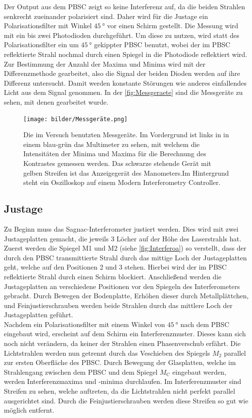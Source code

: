 \noindent Der Output aus dem PBSC zeigt so keine Interferenz auf, da die beiden Strahlen senkrecht zueinander polarisiert sind. Daher wird für die Justage ein Polarisationsfilter mit 
Winkel $\SI{45}{\degree}$ vor einen Schirm gestellt. Die Messung wird mit ein bis zwei Photodioden durchgeführt. Um diese zu nutzen, wird statt des Polarisationsfilter ein um 
$\SI{45}{\degree}$ gekippter PBSC benutzt, wobei der im PBSC reflektierte Strahl nochmal durch einen Spiegel in die Photodiode reflektiert wird. Zur Bestimmung der Anzahl der Maxima 
und Minima wird mit der Differenzmethode gearbeitet, also die Signal der beiden Dioden werden auf ihre Differenz untersucht. Damit werden konstante Störungen wie anderes einfallendes 
Licht aus dem Signal genommen. In der \autoref{fig:Messgeraete} sind die Messgeräte zu sehen, mit denen gearbeitet wurde.

\begin{figure}[h]
    \centering
    \texttt{[image: bilder/Messgeräte.png]}
    \caption{Die im Versuch benutzten Messgeräte. Im Vordergrund ist links in 
    in einem blau-grün das Multimeter zu sehen, mit welchem die Intensitäten der Minima und Maxima für die Berechnung des Kontrastes gemessen werden.
    Das schwarze stehende Gerät mit gelben Streifen ist das Anzeigegerät des Manometers.Im Hintergrund steht ein Oszilloskop auf einem 
    Modern Interferometry Controller.}
    \label{fig:Messgeraete}
\end{figure}


\subsection{Justage}

\noindent Zu Beginn muss das Sagnac-Interferometer justiert werden. Dies wird mit zwei Justageplatten gemacht, die jeweils 3 Löcher auf der Höhe des Laserstrahls hat. 
Zuerst werden die Spiegel M1 und M2 (siehe \autoref{fig:Interferoa}) so verstellt, dass der durch den PBSC transmittierte Strahl durch das mittige Loch der Justageplatten geht, welche 
auf den Positionen 2 und 3 stehen. Hierbei wird der im PBSC reflektierte Strahl durch einen Schirm blockiert. 
Anschließend werden die Justageplatten an verschiedene Positionen vor den Spiegeln des Interferometers gebracht. Durch Bewegen der Bodenplatte, Erhöhen dieser durch Metallplättchen, 
und Feinjustierschrauben werden beide Strahlen durch das mittlere Loch der Justageplatten geführt. \\
Nachdem ein Polarisationsfilter mit einem Winkel von $\SI{45}{\degree}$ nach dem PBSC eingebaut wird, erscheint auf dem Schirm ein Interferenzmuster. Dieses kann sich noch nicht verändern, 
da keiner der Strahlen einen Phasenverschub erfährt. Die Lichtstrahlen werden nun getrennt durch das Veschieben des Spiegels $M_2$ parallel zur ersten Oberfläche des PBSC. 
Durch Bewegung der Glasplatten, welche im Strahlengang zwischen dem PBSC und dem Spiegel $M_{\text{C}}$ eingebaut werden, werden Interferenzmaxima und -minima durchlaufen.
Im Interferenzmuster sind Streifen zu sehen, welche auftreten, da die Lichtstrahlen nicht perfekt parallel ausgerichtet sind. Durch die Feinjustierschrauben werden diese Streifen 
so gut wie möglich entfernt. 


